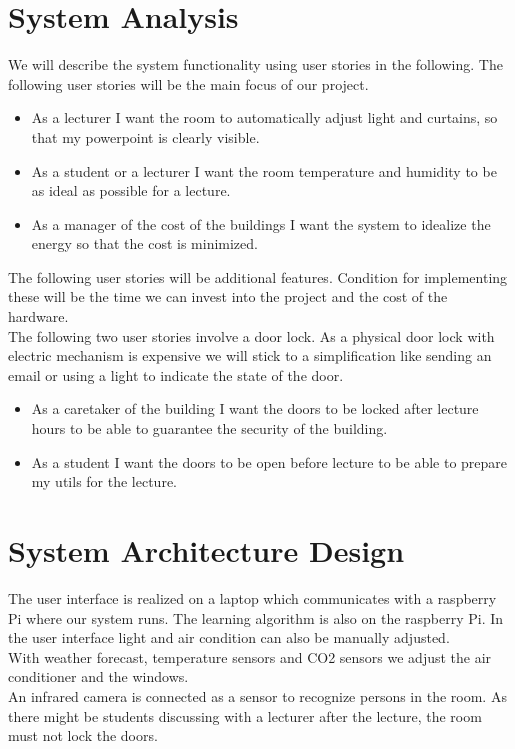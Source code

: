 \documentclass[runningheads]{llncs}
\begin{document}
\section{System Analysis}
We will describe the system functionality using user stories in the following. The following user stories will be the main focus of our project.\\
\begin{itemize}
\item As a lecturer I want the room to automatically adjust light and curtains, so that my powerpoint is clearly visible.\\

\item As a student or a lecturer I want the room temperature and humidity to be as ideal as possible for a lecture.\\

\item As a manager of the cost of the buildings I want the system to idealize the energy so that the cost is minimized.\\
\end{itemize}

The following user stories will be additional features. Condition for implementing these will be the time we can invest into the project and the cost of the hardware.\\ 

The following two user stories involve a door lock. As a physical door lock with electric mechanism is expensive we will stick to a simplification like sending an email or using a light to indicate the state of the door.\\
\begin{itemize}
\item As a caretaker of the building I want the doors to be locked after lecture hours to be able to guarantee the security of the building. \\

\item As a student I want the doors to be open before lecture to be able to prepare my utils for the lecture.\\
\end{itemize}

\section{System Architecture Design}
The user interface is realized on a laptop which communicates with a raspberry Pi where our system runs. The learning algorithm is also on the raspberry Pi. In the user interface light and air condition can also be manually adjusted.\\
With weather forecast, temperature sensors and CO2 sensors we adjust the air conditioner and the windows. \\
An infrared camera is connected as a sensor to recognize persons in the room. As there might be students discussing with a lecturer after the lecture, the room must not lock the doors. \\ 
\end{document}
